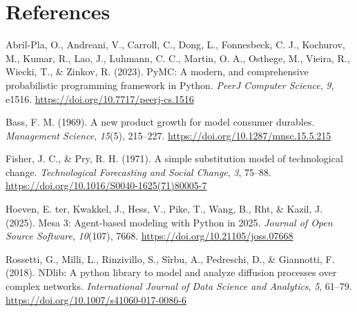 \documentclass[10pt,a4paper,onecolumn]{article}
\newlength{\cslhangindent}
\newenvironment{CSLReferences}[2] %
 {\begin{list}{}{%
  \setlength{\itemindent}{0pt}
  \setlength{\leftmargin}{0pt}
  \setlength{\parsep}{0pt}
  \ifodd #1
   \setlength{\leftmargin}{\cslhangindent}
   \setlength{\itemindent}{-1\cslhangindent}
  \fi
  \setlength{\itemsep}{#2\baselineskip}}}
 {\end{list}}
\begin{document}
\section*{References}\label{references}

\protect{}\label{refs}
\begin{CSLReferences}{1}{0.5}
Abril-Pla, O., Andreani, V., Carroll, C., Dong, L., Fonnesbeck, C. J.,
Kochurov, M., Kumar, R., Lao, J., Luhmann, C. C., Martin, O. A.,
Osthege, M., Vieira, R., Wiecki, T., \& Zinkov, R. (2023). {PyMC}: A
modern, and comprehensive probabilistic programming framework in
{Python}. \emph{PeerJ Computer Science}, \emph{9}, e1516.
\url{https://doi.org/10.7717/peerj-cs.1516}

Bass, F. M. (1969). A new product growth for model consumer durables.
\emph{Management Science}, \emph{15}(5), 215--227.
\url{https://doi.org/10.1287/mnsc.15.5.215}

Fisher, J. C., \& Pry, R. H. (1971). A simple substitution model of
technological change. \emph{Technological Forecasting and Social
Change}, \emph{3}, 75--88.
\url{https://doi.org/10.1016/S0040-1625(71)80005-7}

Hoeven, E. ter, Kwakkel, J., Hess, V., Pike, T., Wang, B., Rht, \&
Kazil, J. (2025). {Mesa} 3: Agent-based modeling with {Python} in 2025.
\emph{Journal of Open Source Software}, \emph{10}(107), 7668.
\url{https://doi.org/10.21105/joss.07668}

Rossetti, G., Milli, L., Rinzivillo, S., Sîrbu, A., Pedreschi, D., \&
Giannotti, F. (2018). {NDlib}: A python library to model and analyze
diffusion processes over complex networks. \emph{International Journal
of Data Science and Analytics}, \emph{5}, 61--79.
\url{https://doi.org/10.1007/s41060-017-0086-6}

\end{CSLReferences}
\end{document}
